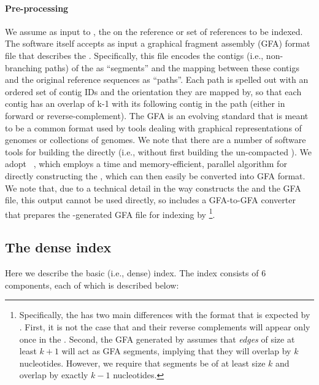\paragraph*{Pre-processing} We assume as input to \pufferfish, the \ccdbg on the reference
or set of references to be indexed. The \pufferfish software itself accepts as input
a graphical fragment assembly (GFA) format file that describes the \ccdbg.
Specifically, this file encodes the contigs (i.e., non-branching paths) of the
\ccdbg as ``segments'' and the mapping between these contigs and the original
reference sequences as ``paths''. Each path is spelled out with an ordered set of contig IDs and the orientation they are mapped by, so that each contig has an overlap of k-1 with its following contig in the path (either in forward or reverse-complement).
The GFA is an evolving standard that is meant
to be a common format used by tools dealing with graphical representations of
genomes or collections of genomes. We note that there are a number of software
tools for building the \ccdbg directly (i.e., without first building the
un-compacted \dbg). We adopt \twopaco~\cite{minkin2016twopaco}, which employs a
time and memory-efficient, parallel algorithm for directly constructing the
\ccdbg, which can then easily be converted into GFA format. We note that, due to
a technical detail in the way \twopaco constructs the \ccdbg and the GFA file,
this output cannot be used directly, so \pufferfish includes a GFA-to-GFA converter
that prepares the \twopaco-generated GFA file for indexing by
\pufferfish\footnote{Specifically, the \twopaco \ccdbg has two main differences with
  the format that is expected by \pufferfish. First, it is not the case that \kmers
  and their reverse complements will appear only once in the \twopaco \ccdbg.
  Second, the GFA generated by \twopaco assumes that \emph{edges} of size at
  least $k+1$ will act as GFA segments, implying that they will overlap by $k$
  nucleotides. However, we require that segments be of at least size $k$ and
  overlap by exactly $k-1$ nucleotides.}.

\subsection*{The dense \pufferfish index}

Here we describe the basic (i.e., dense) \pufferfish index. The index consists of 6
components, each of which is described below:


